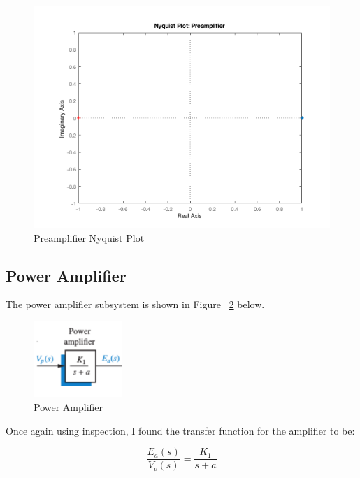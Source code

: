 \documentclass[12pt]{article}
\begin{document}
\begin{figure}[H]
\begin{center}
	\includegraphics[width=\textwidth]{./img/PreampNyquist.png}
	\caption{\label{fig:preampnyquist}Preamplifier Nyquist Plot}
\end{center}
\end{figure}

\subsection{Power Amplifier}

The power amplifier subsystem is shown in Figure ~\ref{fig:amp} below.

\begin{figure}[H]
\begin{center}
	\includegraphics[width=0.3\textwidth]{./img/PowerAmplifierBlock.png}
	\caption{\label{fig:amp}Power Amplifier}
\end{center}
\end{figure}

Once again using inspection, I found the transfer function for the amplifier to be:

\begin{equation}
\frac{E_{a}(s)}{V_{p}(s)} = \frac{K_{1}}{s+a}\label{eq:3}
\end{equation}
\end{document}
